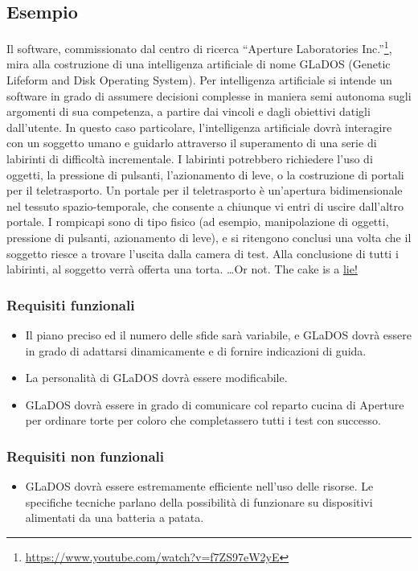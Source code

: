 \documentclass[a4paper,12pt]{report}
\begin{document}
\subsection*{Esempio}
Il software, commissionato dal centro di ricerca ``Aperture Laboratories Inc.''\footnote{
\url{https://www.youtube.com/watch?v=f7ZS97eW2yE}
}, mira alla costruzione di una intelligenza artificiale di nome GLaDOS (Genetic Lifeform and Disk Operating System).
%
Per intelligenza artificiale si intende un software in grado di assumere decisioni complesse in maniera semi autonoma sugli argomenti di sua competenza, a partire dai vincoli e dagli obiettivi datigli dall'utente.
%
In questo caso particolare, l'intelligenza artificiale dovrà interagire con un soggetto umano
e guidarlo attraverso il superamento di una serie di labirinti di difficoltà incrementale.
%
I labirinti potrebbero richiedere l'uso di oggetti, la pressione di pulsanti, l'azionamento di leve,
o la costruzione di portali per il teletrasporto.
%
Un portale per il teletrasporto è un'apertura bidimensionale nel tessuto spazio-temporale,
che consente a chiunque vi entri di uscire dall'altro portale.
%
I rompicapi sono di tipo fisico (ad
esempio, manipolazione di oggetti, pressione di pulsanti, azionamento di leve), e si ritengono
conclusi una volta che il soggetto riesce a trovare l'uscita dalla camera di test.
%
Alla conclusione di tutti i labirinti,
al soggetto verrà offerta una torta.
\textcolor{lie}{\ldots Or not. The cake is a \underline{lie!}}

\subsubsection{Requisiti funzionali}
\begin{itemize}
	\item Il piano preciso ed il numero delle sfide sarà variabile,
	e GLaDOS dovrà essere in grado di adattarsi dinamicamente e di fornire indicazioni di guida.
	\item La personalità di GLaDOS dovrà essere modificabile.
	\item GLaDOS dovrà essere in grado di comunicare col reparto cucina di Aperture
	per ordinare torte per coloro che completassero tutti i test con successo.
\end{itemize}

\subsubsection{Requisiti non funzionali}
\begin{itemize}
	\item GLaDOS dovrà essere estremamente efficiente nell'uso delle risorse. Le specifiche tecniche parlano della possibilità di funzionare su dispositivi alimentati da una batteria a patata.
\end{itemize}
\end{document}
